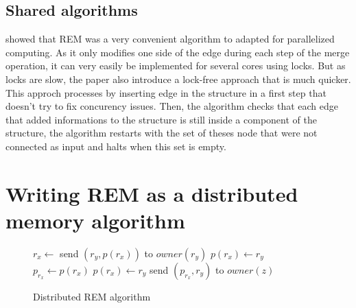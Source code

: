 \documentclass[12px]{article}
\begin{document}
    \subsection{Shared algorithms}
       showed that REM was a very convenient algorithm to adapted for parallelized computing. As it only modifies one side of the edge during each step of the merge operation, it can very easily be implemented for several cores using locks.
      But as locks are slow, the paper also introduce a lock-free approach that is much quicker. This approch processes by inserting edge in the structure in a first step that doesn't try to fix concurency issues. Then, the algorithm checks that each edge that added informations to the structure is still inside a component of the structure, the algorithm restarts with the set of theses node that were not connected as input and halts when this set is empty.


  \section{Writing REM as a distributed memory algorithm}
    \setlength\intextsep{0pt}
    \begin{wrapfigure}{r}{6.5cm}
      \centering
      \begin{minipage}{\linewidth}
        \begin{algorithm}[H]
          \caption{Distributed REM algorithm}%
          \label{alg:rem_distributed}
          \begin{algorithmic}[1]
              \State $r_x \gets$ 
              \State
                \State send $(r_y, p(r_x))$ to $owner(r_y)$
                  \State $p(r_x) \gets r_y$
                \Else
                  \State $p_{r_x} \gets p(r_x)$
                  \State $p(r_x) \gets r_y$
                  \State send $(p_{r_x}, r_y)$ to $owner(z)$
                \EndIf
              \EndIf
            \EndFunction
         \end{algorithmic}
        \end{algorithm}
      \end{minipage}
    \end{wrapfigure}
\end{document}
